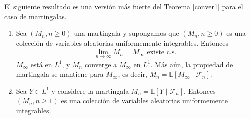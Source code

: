 El siguiente resultado es una versión más fuerte del Teorema \ref{conver1} para el caso de martingalas.

\begin{theorem}
	\begin{enumerate}
	\item Sea $(M_n, n \geq 0)$ una martingala y supongamos que $(M_n, n \geq 0)$ es una colección de variables aleatorias uniformemente integrables. Entonces
	\begin{align*}
	\lim_{n \rightarrow \infty} M_n = M_{\infty} \text{ existe c.s. }
	\end{align*}
	$M_{\infty}$ está en $L^1$, y $M_n$ converge a $M_{\infty}$ en $L^1$. Más aún, la propiedad de martingala se mantiene para $M_{\infty}$, es decir, $M_n = \mathbb{E} \left[ M_{\infty} \mid \mathcal{F}_n \right]$.
	
	\item Sea $Y \in L^1$ y considere la martingala $M_n = \mathbb{E} \left[ Y \mid \mathcal{F}_n \right]$. Entonces $(M_n, n \geq 1)$ es una colección de variables aleatorias uniformemente integrables.
	\end{enumerate}
\end{theorem}
